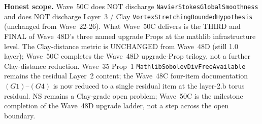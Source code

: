 \begin{remark}
\textbf{Honest scope.} Wave~50C does NOT discharge \texttt{NavierStokesGlobalSmoothness} and does NOT discharge Layer~3 / Clay \texttt{VortexStretchingBoundedHypothesis} (unchanged from Wave~22-26). What Wave~50C delivers is the THIRD and FINAL of Wave~48D's three named upgrade Props at the mathlib infrastructure level. The Clay-distance metric is UNCHANGED from Wave~48D (still 1.0 layer); Wave~50C completes the Wave~48D upgrade-Prop trilogy, not a further Clay-distance reduction. Wave~35 Prop~1 \texttt{MathlibSobolevDivFreeAvailable} remains the residual Layer~2 content; the Wave~48C four-item documentation $(G1)$--$(G4)$ is now reduced to a single residual item at the layer-2.b torus residual. NS remains a Clay-grade open problem; Wave~50C is the milestone completion of the Wave~48D upgrade ladder, not a step across the open boundary.
\end{remark}

